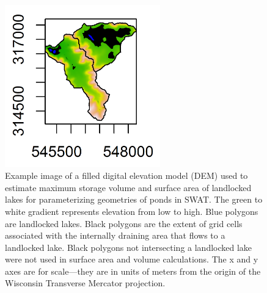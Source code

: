 \begin{figure}[H]
	\centering
	\includegraphics[width=0.6\textwidth]{./img/maximum_pond_volume.png}
	\caption[Estimating maximum storage volume and surface area of landlocked lakes]{Example image of a filled digital elevation model (DEM) used to estimate maximum storage volume and surface area of landlocked lakes for parameterizing geometries of ponds in SWAT. The green to white gradient represents elevation from low to high. Blue polygons are landlocked lakes. Black polygons are the extent of grid cells associated with the internally draining area that flows to a landlocked lake. Black polygons not intersecting a landlocked lake were not used in surface area and volume calculations. The x and y axes are for scale---they are in units of meters from the origin of the Wisconsin Transverse Mercator projection.}
	\label{fig:maximum_pond_volume}
\end{figure}

